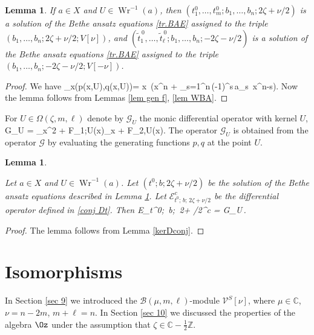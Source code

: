 \documentclass[12pt]{amsart}
\newtheorem{lem}[thm]{Lemma}
\numberwithin{equation}{section}
\theoremstyle{definition}
\let\mc\mathcal
\let\Om\Omega
\let\der\partial
\let\on\operatorname
\def\C{{\mathbb C}}
\def\Z{{\mathbb Z}}
\def\B{{\mc B}}
\def\V{{\mc V}}
\def\Wr{\on{Wr}}
\begin{document}
\begin{lem}
\label{cor gen f}
If $a\in X$ and $U\in \Wr^{-1}(a)$, then
$(t^0_1,\dots,t^0_m; b_1,\dots,b_n; 2\zeta + \nu/2)$ is a solution
of the Bethe ansatz equations \eqref{tr.BAE} assigned to the triple
$(b_1,\dots,b_n; 2\zeta + \nu/2; V[\nu])$, and
$(\tilde t^{\,0}_1,\dots,\tilde t^{\,0}_\ell; b_1,\dots,b_n; - 2\zeta - \nu/2)$ is a solution
of the Bethe ansatz equations \eqref{tr.BAE} assigned to the triple
$(b_1,\dots,b_n; -2\zeta - \nu/2; V[-\nu])$.


 

\end{lem}

\begin{proof}
We have 
\bea
\Wr_x(p(x,U),q(x,U))= x\,
\Big(x^n + \sum_{s=1}^n\,(-1)^s\,a_s \,x^{n-s}\Big).
\eea
Now the lemma follows from Lemmas \ref{lem gen f}, \ref{lem WBA}.
\end{proof}


For $U\in \Om(\zeta, m,\ell)$ denote by $\mc G_U$ the monic differential operator
with kernel $U$, 
\bean
\label{GU}
\mc G_U = \der_x^2 + F_{1;U}(x)\der_x + F_{2,U}(x).
\eean
The operator $\mc G_U$ is 
obtained from the operator $\mc G$ by evaluating the generating functions $p,q$ 
at the point $U$.

\begin{lem}
\label{lem e=g}

Let $a\in X$ and $U\in \Wr^{-1}(a)$. Let $(t^0; b; 2\zeta + \nu/2)$ be the solution of the Bethe ansatz equations
described in Lemma \ref{cor gen f}. Let $\mc E_{t^0;\, b;\, 2\zeta + \nu/2}^c$ 
be the differential operator defined in \eqref{conj Dt}.
Then
\bea
\mc E_{t^0;\, b; \,2\zeta + \nu/2}^c = \mc G_U\,.
\eea
 \end{lem}
 
 \begin{proof}
 The lemma follows from Lemma \ref{kerDconj}.
  \end{proof}
 
 
 

\section{Isomorphisms}
\label{sec 11}

In Section \ref{sec 9} we introduced the $\B(\mu, m,\ell)$-module $\V^S[\nu]$, where
 $\mu\in \C$, \ $\nu = n-2m$, $m+\ell=n$.
In Section \ref{sec 10} we discussed the properties of
the algebra $\Oz$ under the assumption that 
$\zeta\in \C-\frac 12\Z$. 
\end{document}

